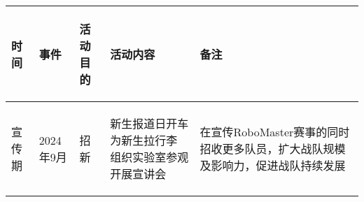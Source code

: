 \begin{longtable}{ X | X | X | X | X }

    \hline

    \endfoot
    
    \rowcolor{tabhdcolor}

        \begin{center}
            时间
        \end{center}&
        \begin{center}
            事件
        \end{center}&
        \begin{center}
            活动目的
        \end{center}&
        \begin{center}
            活动内容
        \end{center}&
        \begin{center}
            备注
        \end{center}\\
        
    \hline
    
    \endhead
    
        \begin{center}
            宣传期
        \end{center}&
        \begin{center}
            2024年9月
        \end{center}&
        \begin{center}
            招新
        \end{center}&
        \begin{center}
            新生报道日开车为新生拉行李
            \newline 组织实验室参观
            \newline 开展宣讲会
        \end{center}&
        \begin{center}
            在宣传RoboMaster赛事的同时招收更多队员，扩大战队规模及影响力，促进战队持续发展
        \end{center}\\
    
    \hline
    

\end{longtable}
